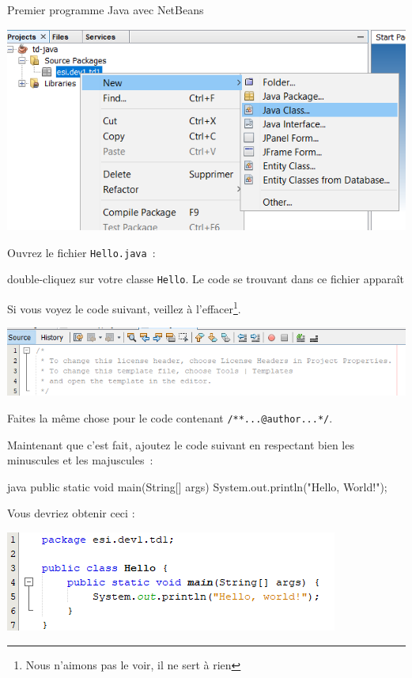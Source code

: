 \documentclass[a4paper,11pt]{article}
\begin{document}
\begin{Tutoriel}{Premier programme Java avec NetBeans}
\begin{steps}
			\bigskip
			
			\begin{center}
				\includegraphics[width=\textwidth]{images/nb_newproject_new_class}
			\end{center}


		\item Ouvrez le fichier \texttt{Hello.java}~:
		
			double-cliquez sur votre classe \texttt{Hello}. 
			Le code se trouvant dans ce fichier apparaît
			
			Si vous voyez le code suivant, 
			veillez à l'effacer\footnote{Nous n'aimons pas le voir, il ne sert à rien}. 
			
			\begin{center}
				\includegraphics[width=\textwidth]{images/nb_newproject_header}
			\end{center}
			
			Faites la même chose pour le code contenant \texttt{/**...@author...*/}.
			
			Maintenant que c'est fait, ajoutez le code suivant en respectant bien les 
			minuscules et les majuscules~:
	
			\begin{Code}{java}
				public static void main(String[] args) {
					System.out.println("Hello, World!");
				}
			\end{Code}
			
			Vous devriez obtenir ceci :
			
			\begin{center}
				\includegraphics{images/nb_newproject_code}
			\end{center}
			

\end{steps}
\end{Tutoriel}
\end{document}
